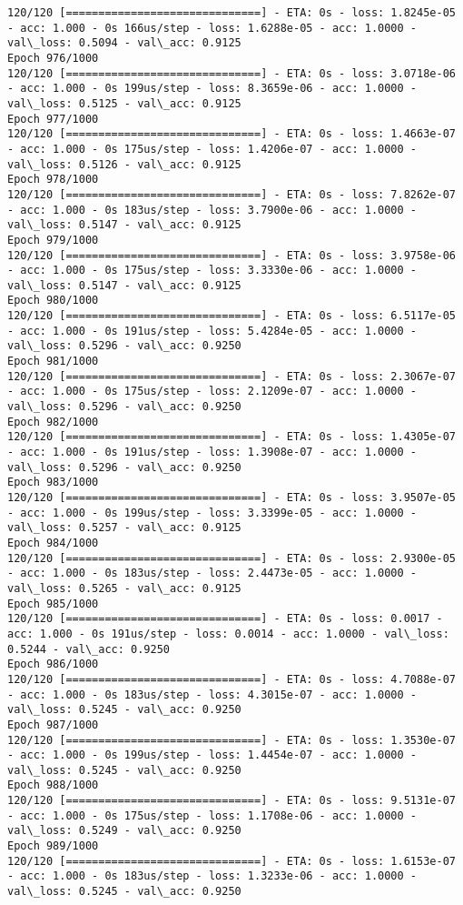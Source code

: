 \documentclass[11pt]{article}
\begin{document}
\begin{Verbatim}[commandchars=\\\{\}]
120/120 [==============================] - ETA: 0s - loss: 1.8245e-05 - acc: 1.000 - 0s 166us/step - loss: 1.6288e-05 - acc: 1.0000 - val\_loss: 0.5094 - val\_acc: 0.9125
Epoch 976/1000
120/120 [==============================] - ETA: 0s - loss: 3.0718e-06 - acc: 1.000 - 0s 199us/step - loss: 8.3659e-06 - acc: 1.0000 - val\_loss: 0.5125 - val\_acc: 0.9125
Epoch 977/1000
120/120 [==============================] - ETA: 0s - loss: 1.4663e-07 - acc: 1.000 - 0s 175us/step - loss: 1.4206e-07 - acc: 1.0000 - val\_loss: 0.5126 - val\_acc: 0.9125
Epoch 978/1000
120/120 [==============================] - ETA: 0s - loss: 7.8262e-07 - acc: 1.000 - 0s 183us/step - loss: 3.7900e-06 - acc: 1.0000 - val\_loss: 0.5147 - val\_acc: 0.9125
Epoch 979/1000
120/120 [==============================] - ETA: 0s - loss: 3.9758e-06 - acc: 1.000 - 0s 175us/step - loss: 3.3330e-06 - acc: 1.0000 - val\_loss: 0.5147 - val\_acc: 0.9125
Epoch 980/1000
120/120 [==============================] - ETA: 0s - loss: 6.5117e-05 - acc: 1.000 - 0s 191us/step - loss: 5.4284e-05 - acc: 1.0000 - val\_loss: 0.5296 - val\_acc: 0.9250
Epoch 981/1000
120/120 [==============================] - ETA: 0s - loss: 2.3067e-07 - acc: 1.000 - 0s 175us/step - loss: 2.1209e-07 - acc: 1.0000 - val\_loss: 0.5296 - val\_acc: 0.9250
Epoch 982/1000
120/120 [==============================] - ETA: 0s - loss: 1.4305e-07 - acc: 1.000 - 0s 191us/step - loss: 1.3908e-07 - acc: 1.0000 - val\_loss: 0.5296 - val\_acc: 0.9250
Epoch 983/1000
120/120 [==============================] - ETA: 0s - loss: 3.9507e-05 - acc: 1.000 - 0s 199us/step - loss: 3.3399e-05 - acc: 1.0000 - val\_loss: 0.5257 - val\_acc: 0.9125
Epoch 984/1000
120/120 [==============================] - ETA: 0s - loss: 2.9300e-05 - acc: 1.000 - 0s 183us/step - loss: 2.4473e-05 - acc: 1.0000 - val\_loss: 0.5265 - val\_acc: 0.9125
Epoch 985/1000
120/120 [==============================] - ETA: 0s - loss: 0.0017 - acc: 1.000 - 0s 191us/step - loss: 0.0014 - acc: 1.0000 - val\_loss: 0.5244 - val\_acc: 0.9250
Epoch 986/1000
120/120 [==============================] - ETA: 0s - loss: 4.7088e-07 - acc: 1.000 - 0s 183us/step - loss: 4.3015e-07 - acc: 1.0000 - val\_loss: 0.5245 - val\_acc: 0.9250
Epoch 987/1000
120/120 [==============================] - ETA: 0s - loss: 1.3530e-07 - acc: 1.000 - 0s 199us/step - loss: 1.4454e-07 - acc: 1.0000 - val\_loss: 0.5245 - val\_acc: 0.9250
Epoch 988/1000
120/120 [==============================] - ETA: 0s - loss: 9.5131e-07 - acc: 1.000 - 0s 175us/step - loss: 1.1708e-06 - acc: 1.0000 - val\_loss: 0.5249 - val\_acc: 0.9250
Epoch 989/1000
120/120 [==============================] - ETA: 0s - loss: 1.6153e-07 - acc: 1.000 - 0s 183us/step - loss: 1.3233e-06 - acc: 1.0000 - val\_loss: 0.5245 - val\_acc: 0.9250

\end{Verbatim}
\end{document}
